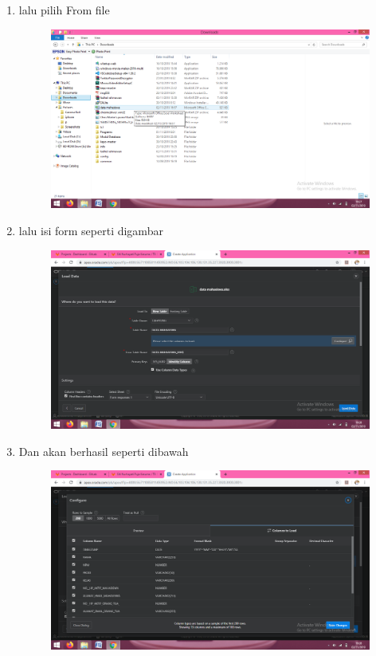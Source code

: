 \begin{enumerate}
\item lalu pilih From file 
	\begin{figure} [!htbp]
	\includegraphics[scale=0.2]{section/gambar/f.png}
	\centering
	\end{figure}
	
	\item lalu isi form seperti digambar 
	\begin{figure} [!htbp]
	\includegraphics[scale=0.2]{section/gambar/g.png}
	\centering
	\end{figure}
	
	
	\item Dan akan berhasil seperti dibawah 
	\begin{figure} [!htbp]
	\includegraphics[scale=0.2]{section/gambar/h.png}
	\centering
	\end{figure}
	

\end{enumerate}
